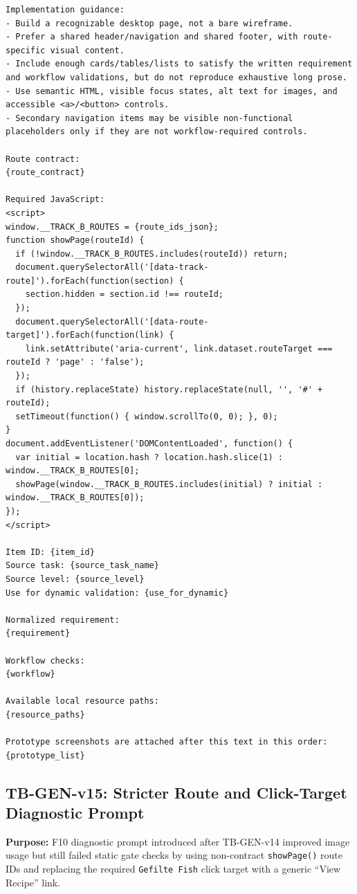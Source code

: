 \begin{verbatim}
Implementation guidance:
- Build a recognizable desktop page, not a bare wireframe.
- Prefer a shared header/navigation and shared footer, with route-specific visual content.
- Include enough cards/tables/lists to satisfy the written requirement and workflow validations, but do not reproduce exhaustive long prose.
- Use semantic HTML, visible focus states, alt text for images, and accessible <a>/<button> controls.
- Secondary navigation items may be visible non-functional placeholders only if they are not workflow-required controls.

Route contract:
{route_contract}

Required JavaScript:
<script>
window.__TRACK_B_ROUTES = {route_ids_json};
function showPage(routeId) {
  if (!window.__TRACK_B_ROUTES.includes(routeId)) return;
  document.querySelectorAll('[data-track-route]').forEach(function(section) {
    section.hidden = section.id !== routeId;
  });
  document.querySelectorAll('[data-route-target]').forEach(function(link) {
    link.setAttribute('aria-current', link.dataset.routeTarget === routeId ? 'page' : 'false');
  });
  if (history.replaceState) history.replaceState(null, '', '#' + routeId);
  setTimeout(function() { window.scrollTo(0, 0); }, 0);
}
document.addEventListener('DOMContentLoaded', function() {
  var initial = location.hash ? location.hash.slice(1) : window.__TRACK_B_ROUTES[0];
  showPage(window.__TRACK_B_ROUTES.includes(initial) ? initial : window.__TRACK_B_ROUTES[0]);
});
</script>

Item ID: {item_id}
Source task: {source_task_name}
Source level: {source_level}
Use for dynamic validation: {use_for_dynamic}

Normalized requirement:
{requirement}

Workflow checks:
{workflow}

Available local resource paths:
{resource_paths}

Prototype screenshots are attached after this text in this order:
{prototype_list}
\end{verbatim}
\endgroup

\subsection{TB-GEN-v15: Stricter Route and Click-Target Diagnostic Prompt}
\label{app:prompt-tb-gen-v15}

\textbf{Purpose:} F10 diagnostic prompt introduced after TB-GEN-v14 improved
image usage but still failed static gate checks by using non-contract
\texttt{showPage()} route IDs and replacing the required \texttt{Gefilte Fish}
click target with a generic ``View Recipe'' link.

